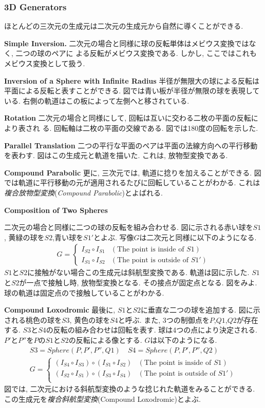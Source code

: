 \subsubsection{3D Generators}
ほとんどの三次元の生成元は二次元の生成元から自然に導くことができる.

\noindent\textbf{Simple Inversion.}
二次元の場合と同様に球の反転単体はメビウス変換ではなく, 二つの球のペアに
よる反転がメビウス変換である.
しかし, ここではこれもメビウス変換として扱う.

\noindent\textbf{Inversion of a Sphere with Infinite Radius}
半径が無限大の球による反転は平面による反転と表すことができる.
図では青い板が半径が無限の球を表現している.
右側の軌道はこの板によって左側へと移されている.

\noindent\textbf{Rotation}
二次元の場合と同様にして, 回転は互いに交わる二枚の平面の反転により表され
る.
回転軸は二枚の平面の交線である.
図では180度の回転を示した.

\noindent\textbf{Parallel Translation}
二つの平行な平面のペアは平面の法線方向への平行移動を表わす.
図はこの生成元と軌道を描いた.
これは, 放物型変換である.

\noindent\textbf{Compound Parabolic}
更に, 三次元では, 軌道に捻りを加えることができる.
図では軌道に平行移動の元が適用されるたびに回転していることがわかる.
これは\emph{複合放物型変換}(\textit{Compound Parabolic})とよばれる.

\noindent\textbf{Composition of Two Spheres}

二次元の場合と同様に二つの球の反転を組み合わせる.
図に示される赤い球を$S1$, 黄緑の球を$S2$,青い球を$S1'$とよぶ.
写像$G$は二次元と同様に以下のようになる.
\begin{align*}
G =
\begin{cases}
 I_{S2} \circ I_{S1} & (\text{The point is inside of } S1) \\
 I_{S1} \circ I_{S2} & (\text{The point is outside of }S1')
\end{cases}
\end{align*}
$S1$と$S2$に接触がない場合この生成元は斜航型変換である.
軌道は図に示した.
$S1$と$S2$が一点で接触し時, 放物型変換となる.
その接点が固定点となる.
図をみよ.
球の軌道は固定点ので接触していることがわかる.

\noindent\textbf{Compound Loxodromic}
最後に, $S1$と$S2$に垂直な二つの球を追加する.
図に示される桃色の球を$S3$, 黄色の球を$S4$と呼ぶ.
また, 3つの制御点を$P$,$Q1$,$Q2$が存在する.
$S3$と$S4$の反転の組み合わせは回転を表す.
球は4つの点により決定される.
$P'$と$P''$を$P$の$S1$と$S2$の反転による像とする.
$G$は以下のようになる.
\begin{align*}
S3 = Sphere(P, P', P'', Q1) \quad
S4 = Sphere(P, P', P'', Q2) \\
G =
\begin{cases}
 (I_{S4} \circ I_{S3}) \circ (I_{S1} \circ I_{S2}) & (\text{The point is inside of } S1) \\
 (I_{S2} \circ I_{S1}) \circ (I_{S3} \circ I_{S4}) & (\text{The point is outside of }S1')\\
\end{cases}
\end{align*}
図では, 二次元における斜航型変換のような捻じれた軌道をみることができる.
この生成元を\emph{複合斜航型変換}(Compound Loxodromic)とよぶ.

